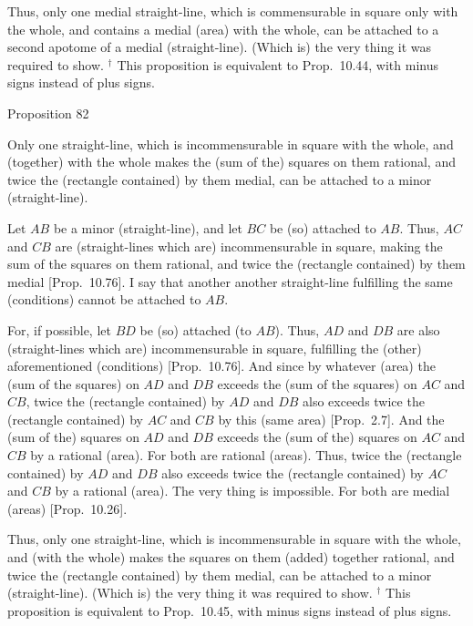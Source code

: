 Thus, only one medial straight-line,
which is commensurable in square only with the whole, and
contains a medial (area) with the whole, can be attached
to a second apotome of a medial (straight-line). (Which is) the very thing it was required to show.
{\footnotesize\noindent$^\dag$ This proposition is equivalent to 
Prop.~10.44, with minus signs instead of
plus signs.}


\begin{center}
{\large Proposition 82}
\end{center}

Only one straight-line, which is incommensurable
in square with the whole, and (together) with the whole makes the (sum of the) squares on them
rational, and twice the (rectangle contained) by them medial, can be
attached to a minor (straight-line).

\epsfysize=0.25in 
\centerline{}

Let $AB$ be a minor (straight-line), and let $BC$ be (so) attached to $AB$.
Thus, $AC$ and $CB$ are (straight-lines which are) incommensurable  in square, making the sum of
the squares on them rational, and twice the (rectangle contained) by them
medial [Prop.~10.76]. I say that another
another straight-line fulfilling the same (conditions) cannot be
attached to $AB$.

For, if possible, let $BD$ be (so) attached (to $AB$). Thus, $AD$
and $DB$ are also (straight-lines which are) incommensurable in square, fulfilling the (other) aforementioned
(conditions) [Prop.~10.76]. And since
by whatever (area) the (sum of the squares) on $AD$ and $DB$
exceeds the (sum of the squares) on $AC$ and $CB$, 
twice the (rectangle contained) by $AD$ and $DB$ also exceeds
twice the (rectangle contained) by $AC$ and $CB$  by this (same area) [Prop.~2.7]. And the (sum of the) squares on
$AD$ and $DB$ exceeds the (sum of the) squares on $AC$ and $CB$
by a rational (area). For both are rational (areas). Thus, twice the
(rectangle contained) by $AD$ and $DB$ also exceeds
twice the (rectangle contained) by $AC$ and $CB$ by a rational (area).
The very thing is impossible. For both are medial (areas) [Prop.~10.26].

Thus,  only one straight-line, which is  incommensurable in square
with the whole, and (with the whole) makes the  squares on them
(added) together rational, and twice the (rectangle contained) by them medial, can be
attached to a minor (straight-line). (Which is) the very thing it was required to
show.
{\footnotesize\noindent$^\dag$ This proposition is equivalent to 
Prop.~10.45, with minus signs instead of plus signs.}

